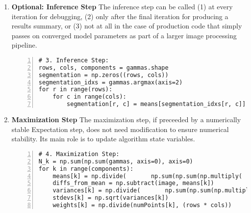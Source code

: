 \documentclass[conference]{IEEEtran}
\begin{document}
\begin{enumerate}
\begin{lstlisting}[style=mypython, numbers=left, stepnumber=1, breakatwhitespace=true]
# compute P_max matrix containing P_n_max values for every n
P_max = np.max(P, axis=2)

# implement expsum calculation used to calculate ln(gamma_n_k)  
expsum = np.zeros((N, M))
for k in range(K):
    expsum += np.exp(P[:, :, k] - P_max)

# implement responsibilities (gamma_n_k) calculation for every n and every k
ln_responsibilities = np.zeros((N, M, K))
ln_expsum = np.log(expsum)
for k in range(K):
    ln_responsibilities[:, :, k] = P[:, :, k] - (P_max + ln_expsum)
responsibilities = np.exp(ln_responsibilities)
\end{lstlisting}

    \item \textbf{Optional: Inference Step} The inference step can be called (1) at every iteration for debugging, (2) only after the final iteration for producing a results summary, or (3) not at all in the case of production code that simply passes on converged model parameters as part of a larger image processing pipeline.
\begin{lstlisting}[style=mypython, numbers=left, stepnumber=1, breakatwhitespace=true]
# 3. Inference Step:
rows, cols, components = gammas.shape
segmentation = np.zeros((rows, cols))
segmentation_idxs = gammas.argmax(axis=2)
for r in range(rows):
    for c in range(cols):
        segmentation[r, c] = means[segmentation_idxs[r, c]]
\end{lstlisting}

    \item \textbf{Maximization Step} The maximization step, if preceeded by a numerically stable Expectation step, does not need modification to ensure numerical stability. Its main role is to update algorithm state variables.
\begin{lstlisting}[style=mypython, numbers=left, stepnumber=1, breakatwhitespace=true]
# 4. Maximization Step:
N_k = np.sum(np.sum(gammas, axis=0), axis=0)
for k in range(components):
    means[k] = np.divide(       np.sum(np.sum(np.multiply(        gammas[:, :, k], image), axis=0), axis=0), N_k[k])
    diffs_from_mean = np.subtract(image, means[k])
    variances[k] = np.divide(       np.sum(np.sum(np.multiply(        gammas[:, :, k], np.square(diffs_from_mean)), axis=0), axis=0), N_k[k])
    stdevs[k] = np.sqrt(variances[k])
    weights[k] = np.divide(numPoints[k], (rows * cols))
\end{lstlisting}


\end{enumerate}
\end{document}
